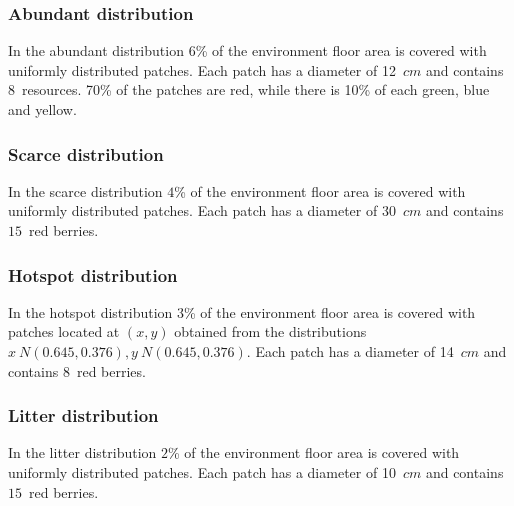 \documentclass[runningheads]{llncs}
\begin{document}
\subsubsection{Abundant distribution} 
In the abundant distribution $6$\% of the environment floor area is covered with uniformly distributed patches. Each patch has a diameter of 12~$cm$ and contains $8$~resources. 70\% of the patches are red, while there is 10\% of each green, blue and yellow.

\vspace{-4mm}
\subsubsection{Scarce distribution}
In the scarce distribution $4$\% of the environment floor area is covered with uniformly distributed patches. Each patch has a diameter of 30~$cm$ and contains $15$~red berries. 

\vspace{-4mm}
\subsubsection{Hotspot distribution} In the hotspot distribution $3$\% of the environment floor area is covered with patches located at $(x,y)$ obtained from the distributions $x~N(0.645, 0.376),y~N(0.645, 0.376)$. Each patch has a diameter of 14~$cm$ and contains $8$~red berries. 

\vspace{-4mm}
\subsubsection{Litter distribution}
In the litter distribution $2$\% of the environment floor area is covered with uniformly distributed patches. Each patch has a diameter of 10~$cm$ and contains $15$~red berries.

\end{document}
